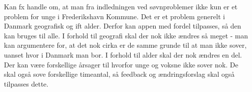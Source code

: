 

Kan fx handle om, at man fra indledningen ved søvnproblemer ikke kun er et problem for unge i Frederikshavn Kommune. Det er et problem generelt i Danmark geografisk og ift alder. Derfor kan appen med fordel tilpasses, så den kan bruges til alle. I forhold til geografi skal der nok ikke ændres så meget - man kan argumentere for, at det nok cirka er de samme grunde til at man ikke sover, uanset hvor i Danmark man bor. I forhold til alder skal der nok ændres en del. Der kan være forskellige årsager til hvorfor unge og voksne ikke sover nok. De skal også sove forskellige timeantal, så feedback og ændringsforslag skal også tilpasses dette. 